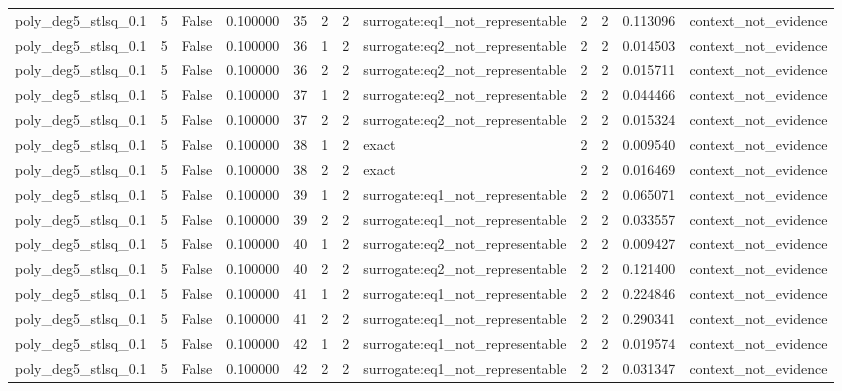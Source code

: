 \begin{tabular}{lrrrrrrlrrrl}
poly\_deg5\_stlsq\_0.1 & 5 & False & 0.100000 & 35 & 2 & 2 & surrogate:eq1\_not\_representable & 2 & 2 & 0.113096 & context\_not\_evidence \\
poly\_deg5\_stlsq\_0.1 & 5 & False & 0.100000 & 36 & 1 & 2 & surrogate:eq2\_not\_representable & 2 & 2 & 0.014503 & context\_not\_evidence \\
poly\_deg5\_stlsq\_0.1 & 5 & False & 0.100000 & 36 & 2 & 2 & surrogate:eq2\_not\_representable & 2 & 2 & 0.015711 & context\_not\_evidence \\
poly\_deg5\_stlsq\_0.1 & 5 & False & 0.100000 & 37 & 1 & 2 & surrogate:eq2\_not\_representable & 2 & 2 & 0.044466 & context\_not\_evidence \\
poly\_deg5\_stlsq\_0.1 & 5 & False & 0.100000 & 37 & 2 & 2 & surrogate:eq2\_not\_representable & 2 & 2 & 0.015324 & context\_not\_evidence \\
poly\_deg5\_stlsq\_0.1 & 5 & False & 0.100000 & 38 & 1 & 2 & exact & 2 & 2 & 0.009540 & context\_not\_evidence \\
poly\_deg5\_stlsq\_0.1 & 5 & False & 0.100000 & 38 & 2 & 2 & exact & 2 & 2 & 0.016469 & context\_not\_evidence \\
poly\_deg5\_stlsq\_0.1 & 5 & False & 0.100000 & 39 & 1 & 2 & surrogate:eq1\_not\_representable & 2 & 2 & 0.065071 & context\_not\_evidence \\
poly\_deg5\_stlsq\_0.1 & 5 & False & 0.100000 & 39 & 2 & 2 & surrogate:eq1\_not\_representable & 2 & 2 & 0.033557 & context\_not\_evidence \\
poly\_deg5\_stlsq\_0.1 & 5 & False & 0.100000 & 40 & 1 & 2 & surrogate:eq2\_not\_representable & 2 & 2 & 0.009427 & context\_not\_evidence \\
poly\_deg5\_stlsq\_0.1 & 5 & False & 0.100000 & 40 & 2 & 2 & surrogate:eq2\_not\_representable & 2 & 2 & 0.121400 & context\_not\_evidence \\
poly\_deg5\_stlsq\_0.1 & 5 & False & 0.100000 & 41 & 1 & 2 & surrogate:eq1\_not\_representable & 2 & 2 & 0.224846 & context\_not\_evidence \\
poly\_deg5\_stlsq\_0.1 & 5 & False & 0.100000 & 41 & 2 & 2 & surrogate:eq1\_not\_representable & 2 & 2 & 0.290341 & context\_not\_evidence \\
poly\_deg5\_stlsq\_0.1 & 5 & False & 0.100000 & 42 & 1 & 2 & surrogate:eq1\_not\_representable & 2 & 2 & 0.019574 & context\_not\_evidence \\
poly\_deg5\_stlsq\_0.1 & 5 & False & 0.100000 & 42 & 2 & 2 & surrogate:eq1\_not\_representable & 2 & 2 & 0.031347 & context\_not\_evidence \\

\end{tabular}
